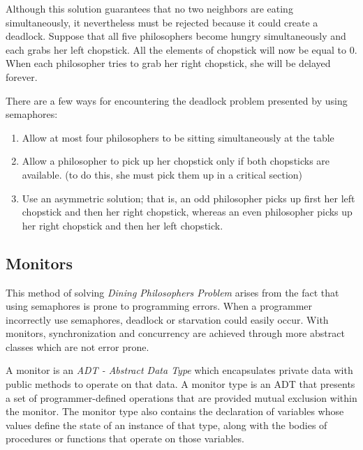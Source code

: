 \documentclass[a4paper,12pt]{article}
\begin{document}
Although this solution guarantees that no two neighbors are eating
simultaneously, it nevertheless must be rejected because it could create
a deadlock. Suppose that all five philosophers become hungry
simultaneously and each grabs her left chopstick. All the elements of
chopstick will now be equal to 0. When each philosopher tries to grab
her right chopstick, she will be delayed forever. \cite{siblerschatz}

There are a few ways for encountering the deadlock problem presented by
using semaphores:

\begin{enumerate}
    \item Allow at most four philosophers to be sitting simultaneously
        at the table

    \item Allow a philosopher to pick up her chopstick only if both
        chopsticks are available. (to do this, she must pick them up in
        a critical section)

    \item Use an asymmetric solution; that is, an odd philosopher picks
        up first her left chopstick and then her right chopstick,
        whereas an even philosopher picks up her right chopstick and
        then her left chopstick.
\end{enumerate}


\subsection{Monitors} %
\label{sub:Monitors}

This method of solving \emph{Dining Philosophers Problem} arises from
the fact that using semaphores is prone to programming errors. When a
programmer incorrectly use semaphores, deadlock or starvation could
easily occur.  With monitors, synchronization and concurrency are
achieved through more abstract classes which are not error prone.

A monitor is an \emph{ADT - Abstract Data Type} which encapsulates
private data with public methods to operate on that data. A monitor type
is an ADT that presents a set of programmer-defined operations that are
provided mutual exclusion within the monitor. The monitor type also
contains the declaration of variables whose values define the state of
an instance of that type, along with the bodies of procedures or
functions that operate on those variables.
\end{document}
